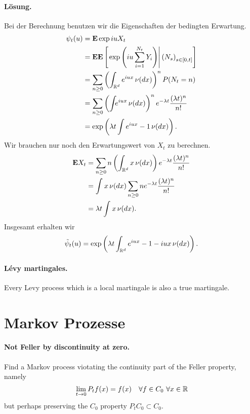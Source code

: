 \paragraph*{Lösung.} Bei der Berechnung benutzen wir die Eigenschaften der bedingten
Erwartung.
\begin{align*}
    \psi_t (u) &= \mathbf{E} \exp iu X_t \\
    &= \mathbf{E} \mathbf{E} \left[ \left. \exp \left( iu \sum_{i=1}^{N_t} Y_i \right) \right| \left( N_s \right)_{s\in [0,t]} \right] \\
    &= \sum_{n \geq 0}^{} \left( \int_{\mathbb R^d} e^{iu x} \, \nu(dx) \right)^n P(N_t = n) \\
    &= \sum_{n \geq 0}^{} \left( \int_{} e^{iu x} \, \nu(dx) \right)^n
        e^{-\lambda t} \frac{(\lambda t)^n}{n!} \\
    &= \exp \left( \lambda t \int e^{iux}-1 \, \nu(dx) \right).
\end{align*}
Wir brauchen nur noch den Erwartungswert von $X_t$ zu berechnen. 
\begin{align*}
    \mathbf{E} X_t &= \sum_{n \geq 0}^{} n \left( \int_{\mathbb R^d} x\, \nu(dx) \right) 
    e^{-\lambda t} \frac{(\lambda t)^n}{n!} \\
    &= \int_{}^{} x \, \nu(dx) \sum_{n \geq 0} n e^{-\lambda t} \frac{(\lambda t)^n}{n!} \\
    &= \lambda t \int_{}^{} x \, \nu (dx). 
\end{align*}
Insgesamt erhalten wir 
\begin{equation*}
    \tilde \psi_t (u) = \exp \left( \lambda t \int_{\mathbb R^d} e^{iux}-1-iux \, \nu(dx) \right).
\end{equation*}





\paragraph{L\'evy martingales.} Every Levy process which is a local martingale is
also a true martingale.



\section{Markov Prozesse}

\paragraph{Not Feller by discontinuity at zero.}
Find a Markov process viotating the continuity part of 
the Feller property, namely
\begin{equation}
\lim_{t\to 0} P_t f(x) = f(x) \quad \forall f \in C_0 \ \forall x\in \mathbb R
\end{equation}
but perhaps preserving the $C_0$ property $P_t C_0 \subset C_0$.



